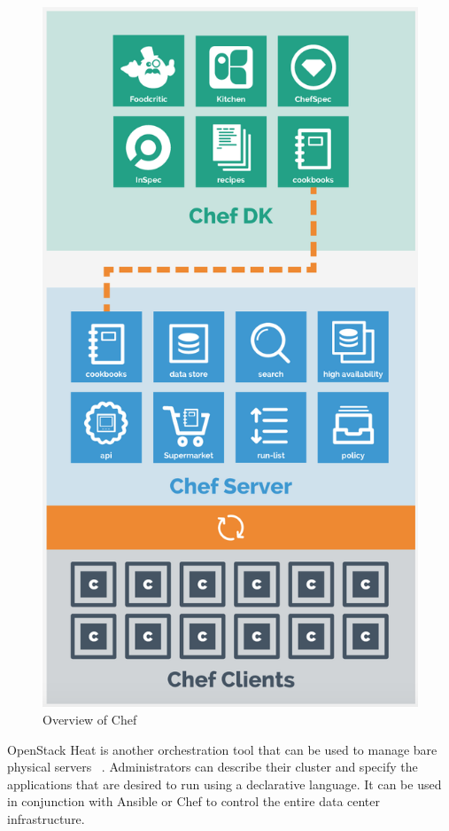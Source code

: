 \documentclass[10pt,twocolumn]{article}
\begin{document}
\begin{figure}[thpb]
  \centering
      \includegraphics[width=\columnwidth]{chef}
    \caption{Overview of Chef ~\cite{chef_overview}}
    \label{fig:chef}
\end{figure}

OpenStack Heat is another orchestration tool that can be used to manage bare physical servers ~\cite{openstack}.
Administrators can describe their cluster and specify the applications that are desired to run using a declarative language.
It can be used in conjunction with Ansible or Chef to control the entire data center infrastructure.
\end{document}
